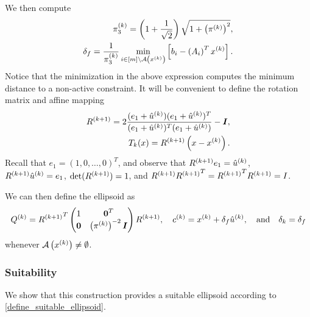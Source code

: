 We then compute
\begin{align}
\pi_3^{(k)}=\left(1+\frac{1}{\sqrt{2}}\right)\sqrt{1+\left(\pi^{(k)}\right)^2}, \label{define_alphakp} \\
\delta_{f} = \frac 1 {\pi_3^{(k)}} \min_{i \in [m] \setminus {\mathcal A}\left(x^{(k)}\right)} \left[{{b}}_i - \left({{A}}_i\right)^Tx^{(k)}\right]. \label{define_deltaf}
\end{align}
Notice that the minimization in the above expression computes the minimum distance to a non-active constraint.
It will be convenient to define the rotation matrix and affine mapping
\begin{align}
{R^{(k+1)}} = 2\frac{(e_1 + {{{\hat u}^{(k)}}})(e_1 +{{{\hat u}^{(k)}}})^T}{(e_1 +{{{\hat u}^{(k)}}})^T(e_1 +{{{\hat u}^{(k)}}})} - \boldsymbol I, \label{define_r} \\
T_k(x) = {R^{(k+1)}}\left(x - x^{(k)}\right). \label{define_affine_mapping}
\end{align}
Recall that $e_1 = (1, 0, \ldots, 0)^T$, and observe that ${R^{(k+1)}} e_1 = {{{\hat u}^{(k)}}}$, ${R^{(k+1)}} {{{\hat u}^{(k)}}} = e_1$, $\det({R^{(k+1)}}) = 1$, and 
${R^{(k+1)}} {R^{(k+1)}} ^T = {R^{(k+1)}} ^T{R^{(k+1)}} = I$.

We can then define the ellipsoid as
\begin{align}
\label{define_linear_nontrival_ellipsoid}
{Q^{(k)}} = {R^{(k+1)}}^T \begin{pmatrix}
1 & \boldsymbol0^T \\
\boldsymbol 0 & \left({\pi^{(k)}}\right)^{-2} \boldsymbol I \\
\end{pmatrix} {R^{(k+1)}},
\quad
c^{(k)} = x^{(k)}+\delta_{f} {{{\hat u}^{(k)}}},
\quad
\textrm{and}
\quad
\delta_k=\delta_{f}
\end{align}
whenever ${\mathcal A}\left(x^{(k)}\right) \ne \emptyset$.





\subsubsection{Suitability}
We show that this construction provides a suitable ellipsoid according to \cref{define_suitable_ellipsoid}.

